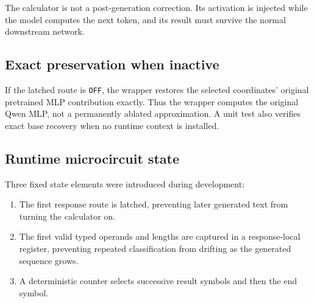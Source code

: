 \documentclass[11pt]{article}
\newcommand{\code}[1]{\texttt{#1}}
\begin{document}
The calculator is not a post-generation correction. Its activation is injected
while the model computes the next token, and its result must survive the normal
downstream network.

\begin{center}
\end{center}

\subsection{Exact preservation when inactive}

If the latched route is \code{OFF}, the wrapper restores the selected
coordinates' original pretrained MLP contribution exactly. Thus the wrapper
computes the original Qwen MLP, not a permanently ablated approximation. A
unit test also verifies exact base recovery when no runtime context is
installed.

\subsection{Runtime microcircuit state}

Three fixed state elements were introduced during development:

\begin{enumerate}
\item The first response route is latched, preventing later generated text
      from turning the calculator on.
\item The first valid typed operands and lengths are captured in a
      response-local register, preventing repeated classification from
      drifting as the generated sequence grows.
\item A deterministic counter selects successive result symbols and then the
      end symbol.
\end{enumerate}
\end{document}
